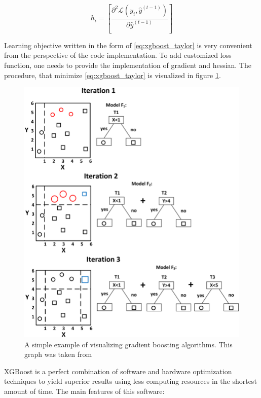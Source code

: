 \begin{equation}
    h_i = \left[\frac{\partial^2 \mathcal{L}(y_{i},\hat{y}^{(t-1)})}{\partial \hat{y}^{(t-1)}} \right]
\end{equation}

Learning objective written in the form of \ref{eq:xgboost_taylor} is very convenient from the perspective of the code implementation. To add customized loss function, one needs to provide the implementation of gradient and hessian. The procedure, that minimize \ref{eq:xgboost_taylor} is visualized in figure \ref{fig:GB_visualization}. 

\begin{figure}
\centering
\includegraphics[scale=0.8]{figures/GB_visualization.png}
\caption{A simple example of visualizing gradient boosting algorithms.
This graph was taken from \cite{GB_visualization}
\label{fig:GB_visualization}}
\end{figure}
  
XGBoost is a perfect combination of software and hardware optimization techniques to yield superior results using less computing resources in the shortest amount of time. The main features of this software: 

